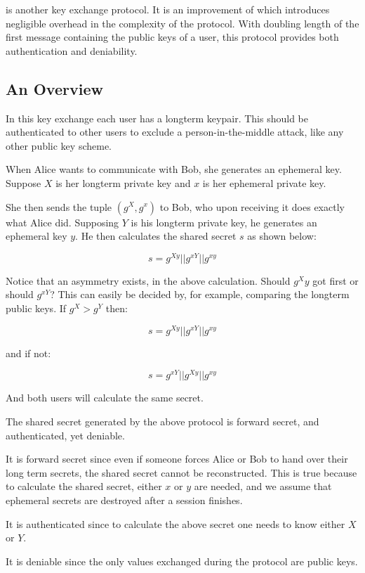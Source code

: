 \tdhname is another key exchange protocol.
It is an improvement of \dhname which introduces negligible overhead in the complexity of the protocol.
With doubling length of the first message containing the public keys of a user, this protocol provides both authentication and deniability.

\subsection{An Overview}

In this key exchange each user has a \dhname longterm keypair.
This should be authenticated to other users to exclude a person-in-the-middle attack, like any other public key scheme.

When Alice wants to communicate with Bob, she generates an ephemeral \dhname key.
Suppose $X$ is her longterm private key and $x$ is her ephemeral private key.

She then sends the tuple $(g^X, g^x)$ to Bob, who upon receiving it does exactly what Alice did.
Supposing $Y$ is his longterm private key, he generates an ephemeral key $y$.
He then calculates the shared secret $s$ as shown below:

\[
  s = g^{Xy} || g^{xY} || g^{xy}
\]

Notice that an asymmetry exists, in the above calculation.
Should $g^Xy$ got first or should $g^{xY}$?
This can easily be decided by, for example, comparing the longterm public keys.
If $g^X > g^Y$ then:

\[
  s = g^{Xy} || g^{xY} || g^{xy}
\]

and if not:

\[
  s = g^{xY}|| g^{Xy} || g^{xy}
\]

And both users will calculate the same secret.

The shared secret generated by the above protocol is forward secret, and authenticated, yet deniable.

It is forward secret since even if someone forces Alice or Bob to hand over their long term secrets, the shared secret cannot be reconstructed.
This is true because to calculate the shared secret, either $x$ or $y$ are needed, and we assume that ephemeral secrets are destroyed after a session finishes.

It is authenticated since to calculate the above secret one needs to know either $X$ or $Y$.

It is deniable since the only values exchanged during the protocol are public keys.

